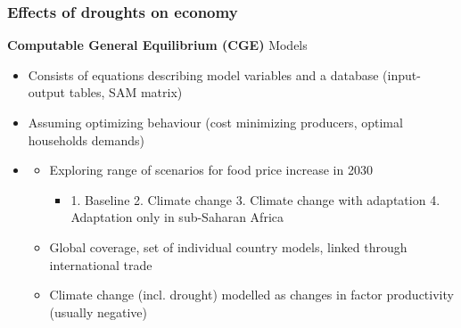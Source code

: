 \documentclass{beamer}              %
\begin{document}
\begin{frame}

\frametitle{Effects of droughts on economy}\label{Effects} 
\begin{block}{\textbf{Computable General Equilibrium (CGE)} Models }
\begin{itemize}

\item Consists of equations describing model variables and a database (input-output tables, SAM matrix)
\item Assuming optimizing behaviour (cost minimizing producers, optimal households demands)


\item \underline{\textbf{\cite{OxfamIDS}}}
\begin{itemize}
\item Exploring range of scenarios for food price increase in 2030
\begin{itemize}
\item 1. Baseline 2. Climate change 3. Climate change with adaptation 4. Adaptation only in sub-Saharan Africa
\end{itemize}
\item Global coverage, set of individual country models, linked through international trade
\item Climate change (incl. drought) modelled as changes in factor productivity (usually negative)

\end{itemize}

\end{itemize}
\end{block}
\end{frame}



\end{document}
